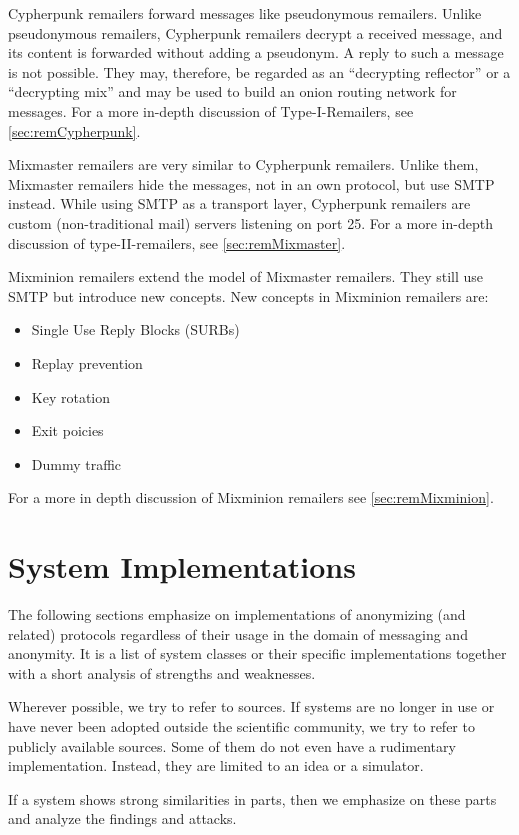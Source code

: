 Cypherpunk remailers forward messages like pseudonymous remailers. Unlike pseudonymous remailers, Cypherpunk remailers decrypt a received message, and its content is forwarded without adding a pseudonym. A reply to such a message is not possible. They may, therefore, be regarded as an ``decrypting reflector'' or a ``decrypting mix'' and may be used to build an onion routing network for messages. For a more in-depth discussion of Type-I-Remailers, see \ref{sec:remCypherpunk}.

Mixmaster remailers are very similar to Cypherpunk remailers. Unlike them, Mixmaster remailers hide the messages, not in an own protocol, but use SMTP instead. While using SMTP as a transport layer, Cypherpunk remailers are custom (non-traditional mail) servers listening on port 25. For a more in-depth discussion of type-II-remailers, see \ref{sec:remMixmaster}.

Mixminion remailers extend the model of Mixmaster remailers. They still use SMTP but introduce new concepts. New concepts in Mixminion remailers are:
\begin{itemize}
	\item Single Use Reply Blocks (SURBs)
	\item Replay prevention
	\item Key rotation
	\item Exit poicies
	\item Dummy traffic
\end{itemize}
For a more in depth discussion of Mixminion remailers see \ref{sec:remMixminion}.

\section{System Implementations\label{sec:sysImpl}}
The following sections emphasize on implementations of anonymizing (and related) protocols regardless of their usage in the domain of messaging and anonymity. It is a list of system classes or their specific implementations together with a short analysis of strengths and weaknesses. 

Wherever possible, we try to refer to sources. If systems are no longer in use or have never been adopted outside the scientific community, we try to refer to publicly available sources. Some of them do not even have a rudimentary implementation. Instead, they are limited to an idea or a simulator.

If a system shows strong similarities in parts, then we emphasize on these parts and analyze the findings and attacks.

